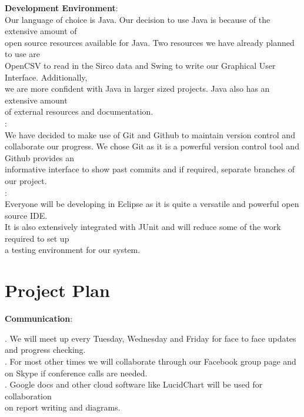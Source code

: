 \documentclass[a4paper]{article}
\begin{document}
{\bf Development Environment}: \\
\indent Our language of choice is Java. Our decision to use Java is because of the extensive amount of \\ 
open source resources available for Java. Two resources we have already planned to use are \\
OpenCSV to read in the Sirco data and Swing to write our Graphical User Interface. Additionally, \\
we are more confident with Java in larger sized projects. Java also has an extensive amount  \\
of external resources and documentation. \\

: \\
\indent We have decided to make use of Git and Github to maintain version control and collaborate 
our progress. We chose Git as it is a powerful version control tool and Github provides an  \\
informative interface to show past commits and if required, separate branches of our project. \\

: \\
\indent Everyone will be developing in Eclipse as it is quite a versatile and powerful open source IDE. \\
It is also extensively integrated with JUnit and will reduce some of the work required to set up \\
a testing environment for our system.

\newpage

\section {Project Plan}

{\bf Communication}: 

.  We will meet up every Tuesday, Wednesday and Friday for face to face updates and progress checking. \\
. For most other times we will collaborate through our Facebook group page and \\
on Skype if conference calls are needed. \\
. Google docs and other cloud software like LucidChart will be used for collaboration \\
 on report writing and diagrams. \\
\end{document}

